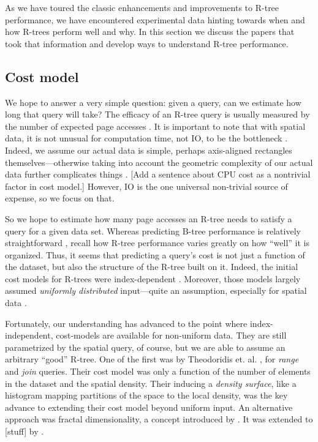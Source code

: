 As we have toured the classic enhancements and improvements to R-tree performance, we have encountered experimental data hinting towards when and how R-trees perform well and why.
In this section we discuss the papers that took that information and develop ways to understand R-tree performance.

\subsection{Cost model}
We hope to answer a very simple question: given a query, can we estimate how long that query will take?
The efficacy of an R-tree query is usually measured by the number of expected page accesses \cite{tocite}.
It is important to note that with spatial data, it is not unusual for computation time, not IO, to be the bottleneck \cite{tocite}.
Indeed, we assume our actual data is simple, perhaps axis-aligned rectangles themselves---otherwise taking into account the geometric complexity of our actual data further complicates things \cite{aboulnaganaughton00}.
[Add a sentence about CPU cost as a nontrivial factor in cost model.]
However, IO is the one universal non-trivial source of expense, so we focus on that.

So we hope to estimate how many page accesses an R-tree needs to satisfy a query for a given data set.
Whereas predicting B-tree performance is relatively straightforward \cite{tocite}, recall how R-tree performance varies greatly on how ``well'' it is organized.
Thus, it seems that predicting a query's cost is not just a function of the dataset, but also the structure of the R-tree built on it.
Indeed, the initial cost models for R-trees were index-dependent \cite{tocite}.
Moreover, those models largely assumed \emph{uniformly distributed} input---quite an assumption, especially for spatial data \cite{tocite}.

Fortunately, our understanding has advanced to the point where index-independent, cost-models are available for non-uniform data.
They are still parametrized by the spatial query, of course, but we are able to assume an arbitrary ``good'' R-tree.
One of the first was by Theodoridis et. al. \cite{theodoridissellis96,theodoridisstefanakissellis00}, for \emph{range} and \emph{join} queries.
Their cost model was only a function of the number of elements in the dataset and the spatial density.
Their inducing a \emph{density surface}, like a histogram mapping partitions of the space to the local density, was the key advance to extending their cost model beyond uniform input.
An alternative approach was fractal dimensionality, a concept introduced by \cite{tocite}.
It was extended to [stuff] by \cite{tocite}.

